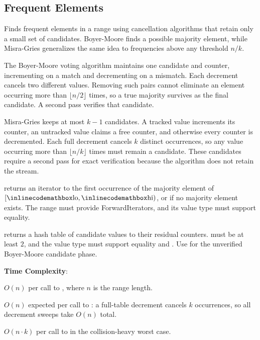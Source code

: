 \subsection{Frequent Elements}
\label{sec:1.6.3}
Finds frequent elements in a range using cancellation algorithms that retain only a small set of candidates. Boyer-Moore finds a possible majority element, while Misra-Gries generalizes the same idea to frequencies above any threshold $n/k$.

The Boyer-Moore voting algorithm maintains one candidate and counter, incrementing on a match and decrementing on a mismatch. Each decrement cancels two different values. Removing such pairs cannot eliminate an element occurring more than $\lfloor n/2 \rfloor$ times, so a true majority survives as the final candidate. A second pass verifies that candidate.

Misra-Gries keeps at most $k - 1$ candidates. A tracked value increments its counter, an untracked value claims a free counter, and otherwise every counter is decremented. Each full decrement cancels $k$ distinct occurrences, so any value occurring more than $\lfloor n/k \rfloor$ times must remain a candidate. These candidates require a second pass for exact verification because the algorithm does not retain the stream.

\begin{compactitem}
  \item {} returns an iterator to the first occurrence of the majority element of $[{\inlinecodemath{lo}}, {\inlinecodemath{hi}})$, or  if no majority element exists. The range must provide ForwardIterators, and its value type must support equality.
  \item {} returns a hash table of candidate values to their residual counters.  must be at least $2$, and the value type must support equality and . Use  for the unverified Boyer-Moore candidate phase.
\end{compactitem}

\textbf{Time Complexity}:
\begin{compactitem}
  \item $O(n)$ per call to , where $n$ is the range length.
  \item $O(n)$ expected per call to : a full-table decrement cancels $k$ occurrences, so all decrement sweeps take $O(n)$ total.
  \item $O(n \cdot k)$ per call to  in the collision-heavy worst case.
\end{compactitem}

